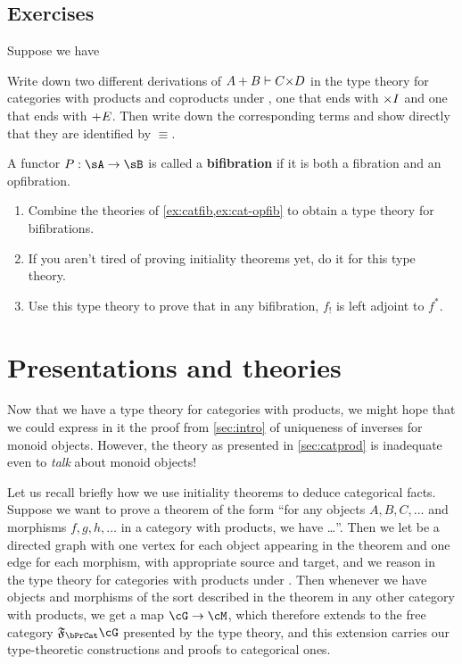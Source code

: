 \subsection*{Exercises}

\begin{ex}\label{ex:cat-prod-coprod-uniq}
  Suppose we have
  Write down two different derivations of $A+B\types C\times D$ in the type theory for categories with products and coproducts under \cG, one that ends with $\timesI$ and one that ends with $\mathord{+}E$.
  Then write down the corresponding terms and show directly that they are identified by $\equiv$.
\end{ex}

\begin{ex}\label{ex:cat-bifib}
  A functor $P:\sA\to\sB$ is called a \textbf{bifibration} if it is both a fibration and an opfibration.
  \begin{enumerate}
  \item Combine the theories of \cref{ex:catfib,ex:cat-opfib} to obtain a type theory for bifibrations.
  \item If you aren't tired of proving initiality theorems yet, do it for this type theory.
  \item Use this type theory to prove that in any bifibration, $f_!$ is left adjoint to $f^*$.
  \end{enumerate}
\end{ex}


\section{Presentations and theories}
\label{sec:unary-theories}

Now that we have a type theory for categories with products, we might hope that we could express in it the proof from \cref{sec:intro} of uniqueness of inverses for monoid objects.
However, the theory as presented in \cref{sec:catprod} is inadequate even to \emph{talk} about monoid objects!

Let us recall briefly how we use initiality theorems to deduce categorical facts.
Suppose we want to prove a theorem of the form ``for any objects $A,B,C,\dots$ and morphisms $f,g,h,\dots$ in a category with products, we have \dots''.
Then we let \cG be a directed graph with one vertex for each object appearing in the theorem and one edge for each morphism, with appropriate source and target, and we reason in the type theory for categories with products under \cG.
Then whenever we have objects and morphisms of the sort described in the theorem in any other category \cM with products, we get a map $\cG\to\cM$, which therefore extends to the free category $\F\bPrCat\cG$ presented by the type theory, and this extension carries our type-theoretic constructions and proofs to categorical ones.


